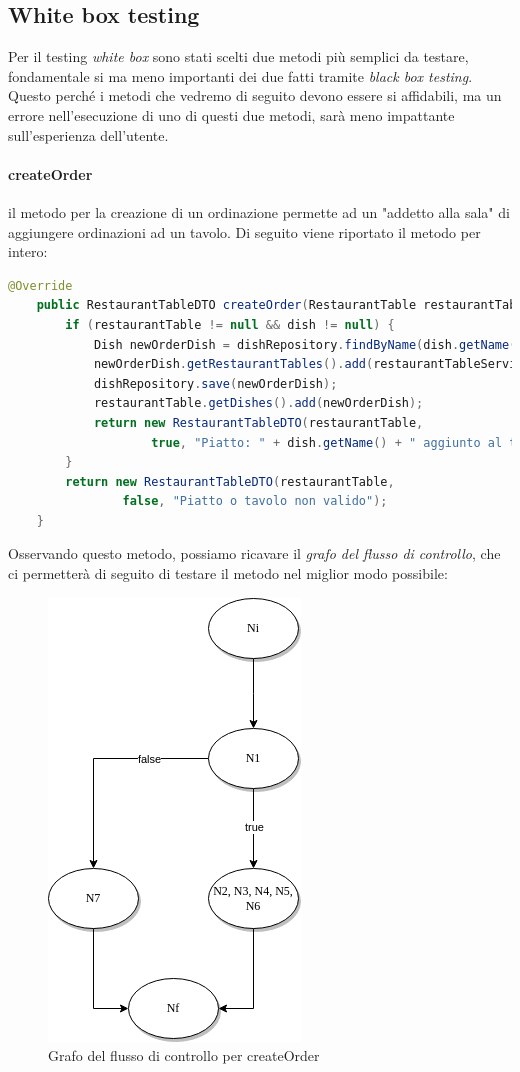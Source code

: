 \subsection{White box testing}
Per il testing \textit{white box} sono stati scelti due metodi più semplici da testare, fondamentale si ma meno importanti dei due fatti tramite \textit{black box testing}. Questo perché i metodi che vedremo di seguito devono essere si affidabili, ma un errore nell'esecuzione di uno di questi due metodi, sarà meno impattante sull'esperienza dell'utente.
\paragraph{createOrder} il metodo per la creazione di un ordinazione permette ad un "addetto alla sala" di aggiungere ordinazioni ad un tavolo. Di seguito viene riportato il metodo per intero:
\begin{lstlisting}[language=java]
    @Override
    public RestaurantTableDTO createOrder(RestaurantTable restaurantTable, Dish dish) {
        if (restaurantTable != null && dish != null) {
            Dish newOrderDish = dishRepository.findByName(dish.getName());
            newOrderDish.getRestaurantTables().add(restaurantTableService.findById(restaurantTable.getId()));
            dishRepository.save(newOrderDish);
            restaurantTable.getDishes().add(newOrderDish);
            return new RestaurantTableDTO(restaurantTable,
                    true, "Piatto: " + dish.getName() + " aggiunto al tavolo: " + restaurantTable.getId().toString());
        }
        return new RestaurantTableDTO(restaurantTable,
                false, "Piatto o tavolo non valido");
    }
\end{lstlisting}
Osservando questo metodo, possiamo ricavare il \textit{grafo del flusso di controllo}, che ci permetterà di seguito di testare il metodo nel miglior modo possibile:
\begin{figure}[H]
    \centering
    \includegraphics[scale=0.8]{img/whiteBox/createOrder.png}
    \caption{Grafo del flusso di controllo per createOrder}
\end{figure}
